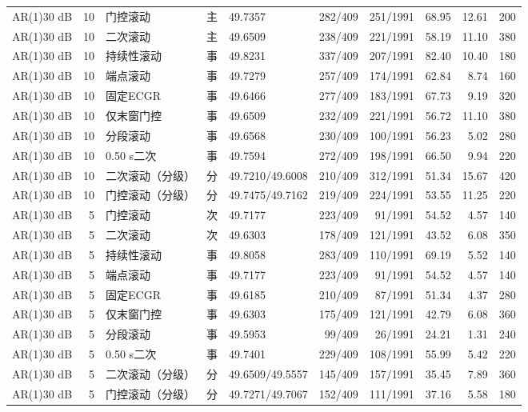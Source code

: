 \documentclass[UTF8,a4paper,11pt]{ctexart}
\begin{document}
\begin{longtable}{lrlclrrrrr}
AR(1)30 dB & 10 & 门控滚动 & 主 & 49.7357 & 282/409 & 251/1991 & 68.95 & 12.61 & 200 \\
AR(1)30 dB & 10 & 二次滚动 & 主 & 49.6509 & 238/409 & 221/1991 & 58.19 & 11.10 & 380 \\
AR(1)30 dB & 10 & 持续性滚动 & 事 & 49.8231 & 337/409 & 207/1991 & 82.40 & 10.40 & 180 \\
AR(1)30 dB & 10 & 端点滚动 & 事 & 49.7279 & 257/409 & 174/1991 & 62.84 & 8.74 & 160 \\
AR(1)30 dB & 10 & 固定ECGR & 事 & 49.6466 & 277/409 & 183/1991 & 67.73 & 9.19 & 320 \\
AR(1)30 dB & 10 & 仅末窗门控 & 事 & 49.6509 & 232/409 & 221/1991 & 56.72 & 11.10 & 380 \\
AR(1)30 dB & 10 & 分段滚动 & 事 & 49.6568 & 230/409 & 100/1991 & 56.23 & 5.02 & 280 \\
AR(1)30 dB & 10 & 0.50 s二次 & 事 & 49.7594 & 272/409 & 198/1991 & 66.50 & 9.94 & 220 \\
AR(1)30 dB & 10 & 二次滚动（分级） & 分 & 49.7210/49.6008 & 210/409 & 312/1991 & 51.34 & 15.67 & 420 \\
AR(1)30 dB & 10 & 门控滚动（分级） & 分 & 49.7475/49.7162 & 219/409 & 224/1991 & 53.55 & 11.25 & 220 \\
AR(1)30 dB & 5 & 门控滚动 & 次 & 49.7177 & 223/409 & 91/1991 & 54.52 & 4.57 & 140 \\
AR(1)30 dB & 5 & 二次滚动 & 次 & 49.6303 & 178/409 & 121/1991 & 43.52 & 6.08 & 350 \\
AR(1)30 dB & 5 & 持续性滚动 & 事 & 49.8058 & 283/409 & 110/1991 & 69.19 & 5.52 & 140 \\
AR(1)30 dB & 5 & 端点滚动 & 事 & 49.7177 & 223/409 & 91/1991 & 54.52 & 4.57 & 140 \\
AR(1)30 dB & 5 & 固定ECGR & 事 & 49.6185 & 210/409 & 87/1991 & 51.34 & 4.37 & 280 \\
AR(1)30 dB & 5 & 仅末窗门控 & 事 & 49.6303 & 175/409 & 121/1991 & 42.79 & 6.08 & 360 \\
AR(1)30 dB & 5 & 分段滚动 & 事 & 49.5953 & 99/409 & 26/1991 & 24.21 & 1.31 & 240 \\
AR(1)30 dB & 5 & 0.50 s二次 & 事 & 49.7401 & 229/409 & 108/1991 & 55.99 & 5.42 & 220 \\
AR(1)30 dB & 5 & 二次滚动（分级） & 分 & 49.6509/49.5557 & 145/409 & 157/1991 & 35.45 & 7.89 & 360 \\
AR(1)30 dB & 5 & 门控滚动（分级） & 分 & 49.7271/49.7067 & 152/409 & 111/1991 & 37.16 & 5.58 & 180 \\

\end{longtable}
\end{document}
